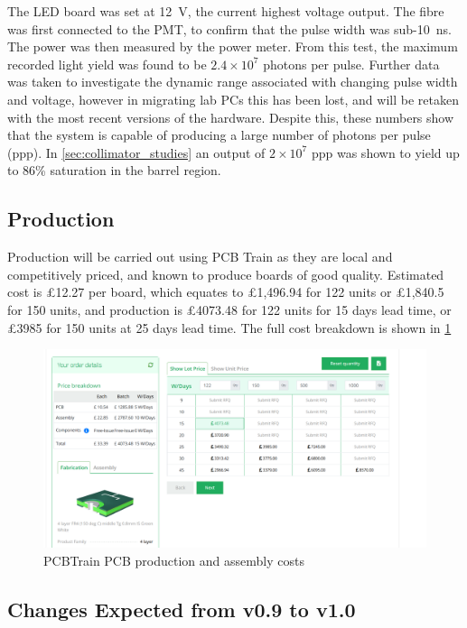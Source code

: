 \documentclass[a4paper,11pt]{article}
\begin{document}
The LED board was set at 12~V, the current highest voltage output. The fibre was first connected to the PMT, to confirm that the pulse width was sub-10~ns. The power was then measured by the power meter. From this test, the maximum recorded light yield was found to be $2.4\times10^7$ photons per pulse. Further data was taken to investigate the dynamic range associated with changing pulse width and voltage, however in migrating lab PCs this has been lost, and will be retaken with the most recent versions of the hardware. Despite this, these numbers show that the system is capable of producing a large number of photons per pulse (ppp). In \cref{sec:collimator_studies} an output of $2\times10^7$ ppp was shown to yield up to 86\% saturation in the barrel region.


\subsection{Production}

Production will be carried out using PCB Train as they are local and competitively priced, and known to produce boards of good quality. Estimated cost is £12.27 per board, which equates to £1,496.94 for 122 units or £1,840.5 for 150 units, and production is £4073.48 for 122 units for 15 days lead time, or £3985 for 150 units at 25 days lead time. The full cost breakdown is shown in \cref{fig:PCBTrainOrder}

\begin{figure}[htbp]
\centering
\includegraphics[scale=0.5]{PCBTrainOrder.png}
\caption{PCBTrain PCB production and assembly costs\label{fig:PCBTrainOrder}}
\end{figure}


\subsection{Changes Expected from v0.9 to v1.0}\label{ImGoingThroughChanges}
\end{document}
